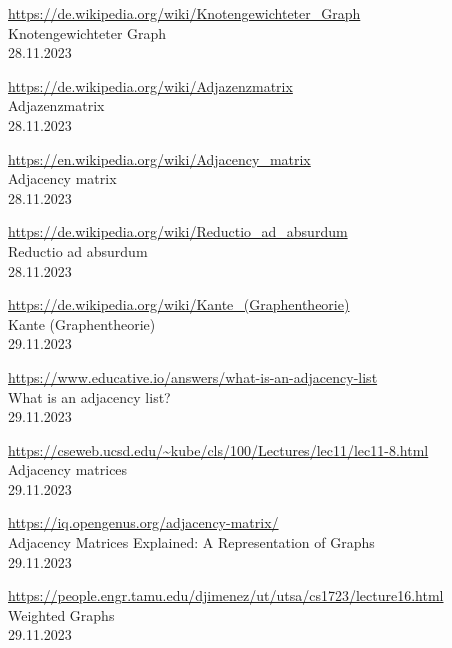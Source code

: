 \begin{thebibliography}{999}
    \href{https://de.wikipedia.org/wiki/Knotengewichteter_Graph}{https://de.wikipedia.org/wiki/Knotengewichteter\_Graph}\\
    Knotengewichteter Graph\\
    28.11.2023

    \href{https://de.wikipedia.org/wiki/Adjazenzmatrix}{https://de.wikipedia.org/wiki/Adjazenzmatrix}\\
    Adjazenzmatrix\\
    28.11.2023

    \href{https://en.wikipedia.org/wiki/Adjacency_matrix}{https://en.wikipedia.org/wiki/Adjacency\_matrix}\\
    Adjacency matrix\\
    28.11.2023

    \href{https://de.wikipedia.org/wiki/Reductio_ad_absurdum}{https://de.wikipedia.org/wiki/Reductio\_ad\_absurdum}\\
    Reductio ad absurdum\\
    28.11.2023

    \href{https://de.wikipedia.org/wiki/Kante_(Graphentheorie)}{https://de.wikipedia.org/wiki/Kante\_(Graphentheorie)}\\
    Kante (Graphentheorie)\\
    29.11.2023

    \href{https://www.educative.io/answers/what-is-an-adjacency-list}{https://www.educative.io/answers/what-is-an-adjacency-list}\\
    What is an adjacency list?\\
    29.11.2023

    \href{https://cseweb.ucsd.edu/~kube/cls/100/Lectures/lec11/lec11-8.html}{https://cseweb.ucsd.edu/{\textasciitilde}kube/cls/100/Lectures/lec11/lec11-8.html}\\
    Adjacency matrices\\
    29.11.2023

    \href{https://iq.opengenus.org/adjacency-matrix/}{https://iq.opengenus.org/adjacency-matrix/}\\
    Adjacency Matrices Explained: A Representation of Graphs\\
    29.11.2023

    \href{https://people.engr.tamu.edu/djimenez/ut/utsa/cs1723/lecture16.html}{https://people.engr.tamu.edu/djimenez/ut/utsa/cs1723/lecture16.html}\\
    Weighted Graphs\\
    29.11.2023


\end{thebibliography}
